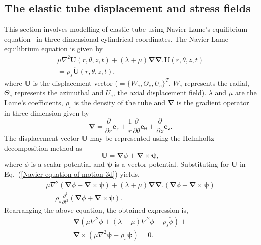 \documentclass[twocolumn,10pt]{asme2ej}
\begin{document}
\subsection{The elastic tube displacement and stress fields}\label{governing equation for 3d cylinder}
This section involves modelling of elastic tube using Navier-Lame's equilibrium equation~\cite{Martin2014} in three-dimensional cylindrical coordinates. The Navier-Lame equilibrium equation is given by
\begin{multline}\label{Navier equation of motion 3d}
    \mu\nabla^{2}\mathbf{U}(r,\theta,z,t)+(\lambda+\mu)\pmb{\nabla}\pmb{\nabla}.\mathbf{U}(r,\theta,z,t)\\ = \rho_s\mathbf{\ddot{U}}(r,\theta,z,t),
\end{multline}
where $\mathbf{U}$ is the displacement vector ($= \{W_e, \Theta_e, U_e\}^T$, $W_e$ represents the radial, $\Theta_e$ represents the azimuthal and $U_e$, the axial displacement field). $\lambda$ and $\mu$ are the Lame's coefficients, $\rho_s$ is the density of the tube and $\pmb{\nabla}$ is the gradient operator in three dimension given by
\begin{equation}\label{del operator}
    \pmb{\nabla} = \frac{\partial}{\partial r}{\mathbf{e_r}} + \frac{1}{r}\frac{\partial}{\partial \theta}\mathbf{e}_{\pmb{\theta}} + \frac{\partial}{\partial z}\mathbf{e_z}.
\end{equation}
The displacement vector $\mathbf{U}$ may be represented using the Helmholtz decomposition method as
 \begin{equation}\label{Helmholtz equation 3d}
    \mathbf{U} = \pmb{\nabla}\phi+\pmb{\nabla}\times\pmb{\psi},
\end{equation}
where $\phi$ is a scalar potential and $\pmb{\psi}$ is a vector potential. Substituting for $\mathbf{U}$ in Eq.~(\ref{Navier equation of motion 3d}) yields,
\begin{multline}
    \mu\nabla^{2}(\pmb{\nabla}\phi+\pmb{\nabla}\times\pmb{\psi})+(\lambda+\mu)\pmb{\nabla}\pmb{\nabla}.(\pmb{\nabla}\phi+\pmb{\nabla}\times\pmb{\psi})\\ = \rho_s\frac{\partial^{2}}{\partial t^{2}}(\pmb{\nabla}\phi+\pmb{\nabla}\times\pmb{\psi}).
\end{multline}
Rearranging the above equation, the obtained expression is,
\begin{multline}\label{NaLa simplified eqn}
    \pmb{\nabla}(\mu\nabla^{2}\phi+(\lambda+\mu)\nabla^{2}\phi-\rho_s\ddot{{\phi}})+\\ \pmb{\nabla}\times(\mu\nabla^{2}\pmb{\psi}-\rho_s\ddot{\pmb{\psi}}) = 0.
\end{multline}
\end{document}
